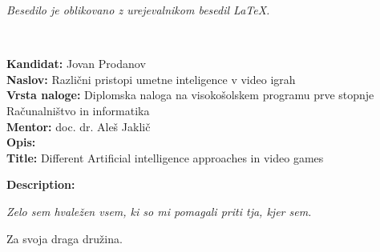\documentclass[a4paper, 12pt]{book}
\newcommand{\ttitle}{Različni pristopi umetne inteligence v video igrah}
\newcommand{\ttitleEn}{Different Artificial intelligence approaches in video games}
\newcommand{\tauthor}{Jovan Prodanov}
\newcommand{\clearemptydoublepage}{\newpage{\pagestyle{empty}\cleardoublepage}}
\begin{document}
\begin{center}
\mbox{}\vfill
\emph{Besedilo je oblikovano z urejevalnikom besedil \LaTeX.}
\end{center}

\clearemptydoublepage

\thispagestyle{empty}
\
\vfill

\bigskip
\noindent\textbf{Kandidat:} \tauthor\\
\noindent\textbf{Naslov:} \ttitle\\
\noindent\textbf{Vrsta naloge:} Diplomska naloga na visokošolskem programu prve stopnje Računalništvo in informatika \\
\noindent\textbf{Mentor:} doc. dr. Aleš Jaklič\\

\bigskip
\noindent\textbf{Opis:}\\

\bigskip
\noindent\textbf{Title:} \ttitleEn

\bigskip
\noindent\textbf{Description:}\\


\vfill

\vspace{2cm}

\clearemptydoublepage

\thispagestyle{empty}\mbox{}\vfill\null\it%
\noindent
Zelo sem hvaležen vsem, ki so mi pomagali priti tja, kjer sem.
\rm\normalfont

\clearemptydoublepage


\thispagestyle{empty}\mbox{}{\textheight}\mbox{}\hfill\begin{minipage}{0.55\textwidth}%
Za svoja draga družina.
\normalfont\end{minipage}

\clearemptydoublepage


\pagestyle{empty}
\def\thepage{}%
\tableofcontents{}


\clearemptydoublepage


\end{document}
